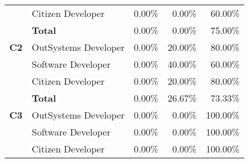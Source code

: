 \begin{table}[tb]
\begin{tabular}{llrrr}
                            & Citizen Developer    & 0.00\%                                                            & 0.00\%                                                                  & 60.00\%                                                       \\
                            & \textbf{Total}       & 0.00\%                                                            & 0.00\%                                                                  & 75.00\%                                                       \\ \hline
  \textbf{C2}               & OutSystems Developer & 0.00\%                                                            & 20.00\%                                                                 & 80.00\%                                                       \\
                            & Software Developer   & 0.00\%                                                            & 40.00\%                                                                 & 60.00\%                                                       \\
                            & Citizen Developer    & 0.00\%                                                            & 20.00\%                                                                 & 80.00\%                                                       \\
                            & \textbf{Total}       & 0.00\%                                                            & 26.67\%                                                                 & 73.33\%                                                       \\ \hline
  \textbf{C3}               & OutSystems Developer & 0.00\%                                                            & 0.00\%                                                                  & 100.00\%                                                      \\
                            & Software Developer   & 0.00\%                                                            & 0.00\%                                                                  & 100.00\%                                                      \\
                            & Citizen Developer    & 0.00\%                                                            & 0.00\%                                                                  & 100.00\%                                                      \\

\end{tabular}
\end{table}
